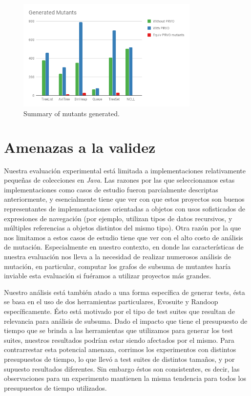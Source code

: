 \begin{figure}[t]
	\begin{center}
		\includegraphics[width=9cm]{figures/Generated_Mutants.png}
	\end{center}
	\caption{Summary of mutants generated.}
	\label{mutants-results}
\end{figure}


\section{Amenazas a la validez}

Nuestra evaluaci\'on experimental est\'a limitada a implementaciones relativamente peque\~nas de colecciones en \emph{Java}. Las razones por las que seleccionamos estas implementaciones como casos de estudio fueron parcialmente descriptas anteriormente, y esencialmente tiene que ver con que estos proyectos son buenos representantes de implementaciones orientadas a objetos con usos sofisticados de expresiones de navegaci\'on (por ejemplo, utilizan tipos de datos recursivos, y m\'ultiples referencias a objetos distintos del mismo tipo). Otra raz\'on por la que nos limitamos a estos casos de estudio tiene que ver con el alto costo de an\'alisis de mutaci\'on. Especialmente en nuestro contexto, en donde las caracter\'isticas de nuestra evaluaci\'on nos lleva a la necesidad de realizar numerosos an\'alisis de mutaci\'on, en particular, computar los grafos de subsuma de mutantes har\'ia inviable esta evaluaci\'on si fu\'eramos a utilizar proyectos m\'as grandes.

Nuestro an\'alisis est\'a tambi\'en atado a una forma espec\'ifica de generar tests, \'esta se basa en el uso de dos herramientas particulares, Evosuite y Randoop espec\'ificamente. \'Esto est\'a motivado por el tipo de test suites que resultan de relevancia para an\'alisis de subsuma. Dado el impacto que tiene el presupuesto de tiempo que se brinda a las herramientas que utilizamos para generar los test suites, nuestros resultados podr\'ian estar siendo afectados por el mismo. Para contrarrestar esta potencial amenaza, corrimos los experimentos con distintos presupuestos de tiempo, lo que llev\'o a test suites de distintos tama\~nos, y por supuesto resultados diferentes. Sin embargo \'estos son consistentes, es decir, las observaciones para un experimento mantienen la misma tendencia para todos los presupuestos de tiempo utilizados.

